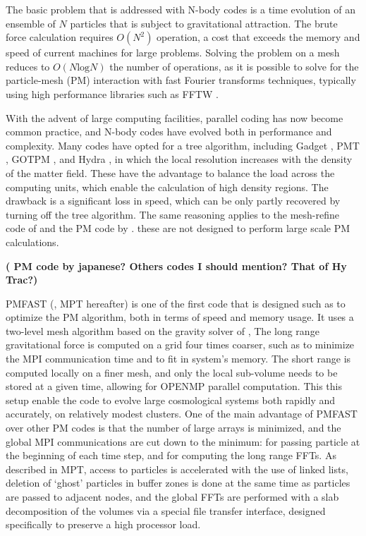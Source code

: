 The basic problem that is addressed with N-body codes is a time evolution of an ensemble of $N$ particles
that is subject to gravitational attraction. The brute force calculation requires $O(N^{2})$ operation, a cost that 
exceeds the memory and speed of current machines for large problems.
Solving the problem  on a mesh \citep{1981csup.book.....H} reduces to $O(N\mbox{log}N)$ the number of operations,
as it is possible to solve for the particle-mesh (PM) interaction with fast Fourier transforms techniques, 
typically using high performance libraries such as {\small FFTW} \citep{FFTW3}.


With the advent of large computing facilities, parallel coding has now become 
common practice, and N-body codes have evolved both in performance and complexity. 
Many codes have opted for a tree algorithm, including Gadget \citep{Gadjet, Gadjet2}, PMT \citep{1995ApJS...98..355X}, GOTPM \citep{2004NewA....9..111D}, and Hydra \citep{Hydra}, in which the local resolution increases with the density of the matter field. 
These have the advantage to balance the load across the computing units, which enable the calculation of high density regions. 
The drawback is a significant loss in speed, which can be only partly recovered by turning off the tree algorithm. 
The same reasoning applies to the mesh-refine code of  \cite{1991ApJ...368L..23C} and the PM code by \cite{FerrelBertschinger1995}.
 these are not designed to perform large scale PM calculations. 

{\bf ( PM code by japanese? Others codes I should mention? That of Hy Trac?)}


{\small PMFAST} (\cite{2005NewA...10..393M}, MPT hereafter) is one of the first code that is designed such as to optimize the PM algorithm,
both in terms of speed and memory usage. It uses a two-level mesh algorithm based on the gravity solver of \cite{2003AAS...203.9703T},
The long range gravitational force is computed on a  grid four times coarser, such as to minimize the {\small MPI} communication time
and to fit in system's memory. The short range is computed locally on a finer mesh, and only the local sub-volume needs 
to be stored at a given time, allowing for {\small OPENMP} parallel computation.
This this setup enable the code to evolve large cosmological systems both rapidly and accurately, on relatively modest clusters.
One of the main advantage of {\small PMFAST} over other PM codes is that the number of large arrays is minimized,
and the global {\small MPI} communications are cut down to the minimum: for passing particle at the beginning of each time step,
and  for computing the long range FFTs.
As described in MPT, access to particles is accelerated with the use of linked lists, deletion of `ghost' particles
in buffer zones is done at the same time as particles are passed to adjacent nodes,
and the global FFTs are performed with a slab decomposition of the volumes via a special file transfer interface, 
designed specifically to preserve a high processor load.

